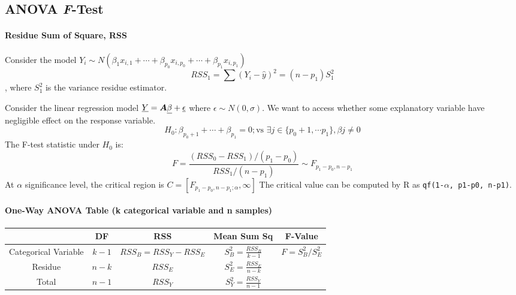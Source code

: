 \documentclass[10pt]{article}
\begin{document}
\subsection{ANOVA \textit{F}-Test}
\paragraph{Residue Sum of Square, RSS}
Consider the model $Y_i \sim N(\beta_1x_{i,1}+\cdots+\beta_{p_0}x_{i, p_0}+\cdots+ \beta_{p_1}x_{i, p_1})$
\[RSS_1=\sum (Y_i-\hat{y})^2=(n-p_1)S^2_1\], where $S^2_1$ is the variance residue estimator.
\begin{definition}
	Consider the linear regression model $\underline{Y} = \bm{A} \underline{\beta}+\underline{\epsilon}$ where $\epsilon \sim N(0, \sigma) $. 
	We want to access whether some explanatory variable have negligible effect on the response variable.
	\[H_0: \beta_{p_0+1} + \cdots + \beta_{p_1}=0; \text{vs } \exists j \in \{p_{0}+1, \cdots p_1\}, \beta j \neq 0 \]
	The F-test statistic under $H_0$ is:
	\[F=\frac{(RSS_0-RSS_1)/(p_1-p_0)}{RSS_1/(n-p_1)} \sim F_{p_1-p_0, n-p_1}\]
	At $\alpha$ significance level, the critical region is $C=[F_{p_1-p_0, n-p_1; \alpha}, \infty]$
	The critical value can be computed by R as \texttt{qf(1-$\alpha$, p1-p0, n-p1)}.
\end{definition}

\paragraph{One-Way ANOVA Table (k categorical variable and n samples)}
\begin{table}[ht]
	\centering
	\begin{tabular}{|c|c|c|c|c|}
			 & DF & RSS & Mean Sum Sq & F-Value \\
			\hline
			Categorical Variable & $k-1$ & $RSS_B=RSS_Y-RSS_E$ & $S^2_B=\frac{RSS_B}{k-1}$ & $F=S^2_B/S^2_E$\\
			Residue & $n-k$ & $RSS_E$ & $S_E^2=\frac{RSS_E}{n-k}$ & \\
			Total & $n-1$ & $RSS_Y$ & $S_Y^2=\frac{RSS_Y}{n-1}$& \\
	\end{tabular}
\end{table}
\end{document}
